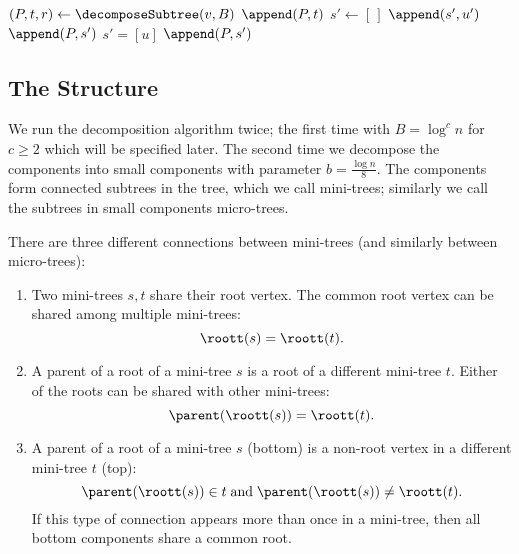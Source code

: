 \begin{algorithm}
\begin{algorithmic}
	\State $(P, t, r) \gets \decomposeSubtree(v, B)$ 
	 
			\State $\append(P, t)$ 
		\Else {}
			\State $s' \gets [\,]$
			 
				\State $\append(s', u')$
				 
					\State $\append(P, s')$%
					\Instr $s' = [u]$ 
				\EndIf
			\EndFor
			\State $\append(P, s')$ 
		\EndIf
	\EndIf
	\State {}
\EndFunction
\end{algorithmic}
\end{algorithm}

\subsection{The Structure}

We run the decomposition algorithm twice; the first time with $B = \log^c n$ for $c \ge 2$ which will be specified later.
The second time we decompose the components into small components with parameter $b = \frac{\log n}{8}$.
The components form connected subtrees in the tree, which we call mini-trees; similarly we call the subtrees in small components micro-trees.

There are three different connections between mini-trees (and similarly between micro-trees):
\begin{enumerate}
	\item Two mini-trees $s, t$ share their root vertex.
	The common root vertex can be shared among multiple mini-trees:
	$$\roott(s) = \roott(t).$$

	\item A parent of a root of a mini-tree $s$ is a root of a different mini-tree $t$.
	Either of the roots can be shared with other mini-trees:
	$$\parent(\roott(s)) = \roott(t).$$

	\item A parent of a root of a mini-tree $s$ (bottom) is a non-root vertex in a different mini-tree $t$ (top):
	$$\parent(\roott(s)) \in t \booland \parent(\roott(s)) \ne \roott(t).$$
	If this type of connection appears more than once in a mini-tree, then all bottom components share a common root.
\end{enumerate}

